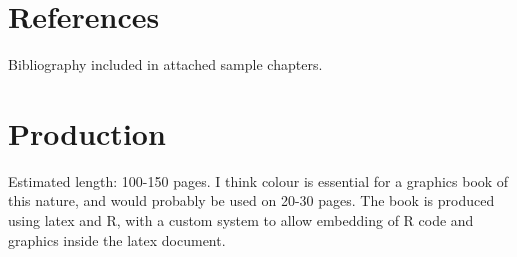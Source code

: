 \documentclass[oneside,letterpaper]{scrartcl}
\begin{document}
\section{References}\label{sec:references} 


Bibliography included in attached sample chapters.

\section{Production}\label{sec:production}


Estimated length: 100-150 pages.  I think colour is essential for a graphics book of this nature, and would probably be used on 20-30 pages.  The book is produced using latex and R, with a custom system to allow embedding of R code and graphics inside the latex document.


\end{document}

